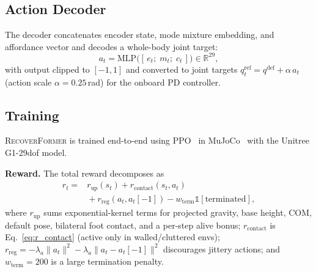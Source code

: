 \documentclass[conference,letterpaper]{IEEEtran}
\newcommand{\at}{a_t}
\newcommand{\ct}{c_t}
\newcommand{\methodname}{\textsc{RecoverFormer}}
\begin{document}
\subsection{Action Decoder}

The decoder concatenates encoder state, mode mixture embedding, and affordance vector and decodes a whole-body joint target:
\begin{equation}
    \at = \mathrm{MLP}\big([\,e_t;\; m_t;\; \ct\,]\big) \in \mathbb{R}^{29},
\end{equation}
with output clipped to $[-1,1]$ and converted to joint targets $q^{\mathrm{ref}}_t = q^{\mathrm{def}}+\alpha\,\at$ (action scale $\alpha{=}0.25$\,rad) for the onboard PD controller.

\subsection{Training}
\label{sec:reward}

\methodname{} is trained end-to-end using PPO~\cite{schulman2017ppo} in MuJoCo~\cite{todorov2012mujoco} with the Unitree G1-29dof model.

\textbf{Reward.}
The total reward decomposes as
\begin{equation}
\begin{aligned}
    r_t ={}& r_{\mathrm{up}}(s_t) + r_{\mathrm{contact}}(s_t,\at)\\
         &{}+ r_{\mathrm{reg}}(\at,\at[-1]) - w_{\mathrm{term}}\mathbb{1}[\text{terminated}],
\end{aligned}
\end{equation}
where $r_{\mathrm{up}}$ sums exponential-kernel terms for projected gravity, base height, COM, default pose, bilateral foot contact, and a per-step alive bonus; $r_{\mathrm{contact}}$ is Eq.~\eqref{eq:r_contact} (active only in walled/cluttered envs); $r_{\mathrm{reg}}=-\lambda_a\|\at\|^2-\lambda_{\dot a}\|\at-\at[-1]\|^2$ discourages jittery actions; and $w_{\mathrm{term}}{=}200$ is a large termination penalty.
\end{document}
